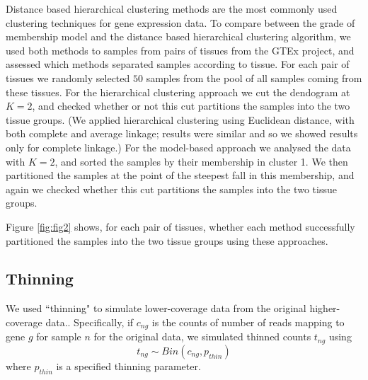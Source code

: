 Distance based hierarchical clustering methods are the most commonly used clustering techniques for gene expression data. To compare between the grade of membership model and the distance based hierarchical clustering algorithm, we used both methods to samples from pairs of tissues from the GTEx project, and assessed 
which methods separated samples according to tissue.  For each pair of tissues  we randomly selected $50$ samples from the pool of all samples coming from these tissues. 
For the hierarchical clustering approach we cut the dendogram at $K=2$, and checked whether or not this cut partitions the samples into the two tissue groups. 
(We applied hierarchical clustering using Euclidean distance, with both complete and average linkage; results were similar and so we showed results only for complete linkage.) 
For the model-based approach we analysed the data with $K=2$, and sorted the samples by their membership in cluster 1. We then partitioned the samples at the point of the steepest fall in this membership, and again we checked whether this cut partitions the samples into the two tissue groups.

Figure \ref{fig:fig2} shows, for each pair of tissues, whether each method successfully partitioned the samples into the two tissue groups using these approaches.
%


\subsection{Thinning}

We used ``thinning" to simulate lower-coverage data from the original higher-coverage data.. 
Specifically, if $c_{ng}$ is the counts of number of reads mapping to gene $g$ for sample $n$ for the original data, we simulated 
thinned counts $t_{ng}$ using 
\begin{equation}
t_{ng} \sim Bin (c_{ng}, p_{thin})
\end{equation}
where $p_{thin}$ is a specified thinning parameter.



